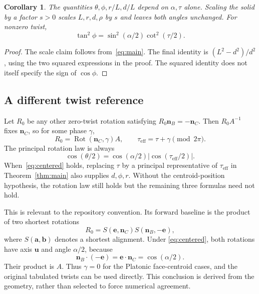 \documentclass[11pt]{article}
\newtheorem{corollary}[theorem]{Corollary}
\theoremstyle{definition}
\newcommand{\nb}{\mathbf n_B}
\newcommand{\nc}{\mathbf n_C}
\newcommand{\ee}{\mathbf e}
\newcommand{\uu}{\mathbf u}
\newcommand{\Rot}{\operatorname{Rot}}
\newcommand{\eff}{\tau_{\mathrm{eff}}}
\begin{document}
\begin{corollary}\label{cor:shape}
The quantities $\theta,\phi,r/L,d/L$ depend on $\alpha,\tau$ alone. Scaling
the solid by a factor $s>0$ scales $L,r,d,\rho$ by $s$ and leaves both angles
unchanged. For nonzero twist,
\begin{equation}\label{eq:tanphi}
 \tan^2\phi=\sin^2(\alpha/2)\cot^2(\tau/2).
\end{equation}
\end{corollary}
\begin{proof}
The scale claim follows from~\eqref{eq:main}. The final identity is
$(L^2-d^2)/d^2$, using the two squared expressions in the proof.
The squared identity does not itself specify the sign of $\cos\phi$.
\end{proof}

\subsection{A different twist reference}
Let $R_0$ be any other zero-twist rotation satisfying $R_0\nb=-\nc$.
Then $R_0A^{-1}$ fixes $\nc$, so for some phase $\gamma$,
\begin{equation}\label{eq:phase}
 R_0=\Rot(\nc,\gamma)A,
 \qquad
 \eff=\tau+\gamma\pmod{2\pi}.
\end{equation}
The principal rotation law is always
\begin{equation}\label{eq:generalrotation}
 \cos(\theta/2)=\cos(\alpha/2)|\cos(\eff/2)|.
\end{equation}
When~\eqref{eq:centered} holds, replacing $\tau$ by a principal representative
of $\eff$ in Theorem~\ref{thm:main} also supplies $d,\phi,r$. Without the
centroid-position hypothesis, the rotation law still holds but the remaining
three formulas need not hold.

This is relevant to the repository convention. Its forward baseline is the
product of two shortest rotations
\begin{equation}\label{eq:sourcebaseline}
 R_0=S(\ee,\nc)S(\nb,-\ee),
\end{equation}
where $S(\mathbf a,\mathbf b)$ denotes a shortest alignment. Under
\eqref{eq:centered}, both rotations have axis $\uu$ and angle $\alpha/2$,
because
\[
 \nb\cdot(-\ee)=\ee\cdot\nc=\cos(\alpha/2).
\]
Their product is $A$. Thus $\gamma=0$ for the Platonic face-centroid cases,
and the original tabulated twists can be used directly. This conclusion is
derived from the geometry, rather than selected to force numerical agreement.
\end{document}

